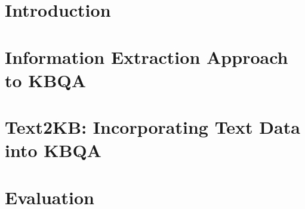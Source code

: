 \documentclass{sig-alternate-05-2015}
\begin{document}
%

%
%
%
%



\section{Introduction}
\label{section:intro}


\section{Information Extraction Approach to KBQA}
\label{section:baseline}


\section{Text2KB: Incorporating Text Data into KBQA}
\label{section:method}


\section{Evaluation}
\label{section:eval}

\end{document}
